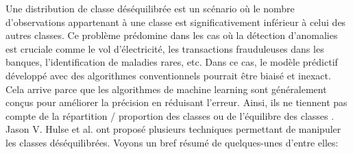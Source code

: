 \documentclass[12pt, french]{report}
\begin{document}
Une distribution de classe déséquilibrée est un scénario où le nombre d'observations appartenant à une classe est significativement inférieur à celui des autres classes. 
Ce problème prédomine dans les cas où la détection d'anomalies est cruciale comme le vol d'électricité, les transactions frauduleuses dans les banques, l'identification de maladies rares, etc. Dans ce cas, le modèle prédictif développé avec des algorithmes conventionnels pourrait être biaisé et inexact.\\
Cela arrive parce que les algorithmes de machine learning sont généralement conçus pour améliorer la précision en réduisant l'erreur. Ainsi, ils ne tiennent pas compte de la répartition / proportion des classes ou de l'équilibre des classes .\\

Jason V. Hulse et al. \cite{key45} ont proposé plusieurs techniques permettant de manipuler les classes déséquilibrées. Voyons un bref résumé de quelques-unes d'entre elles:
\end{document}
